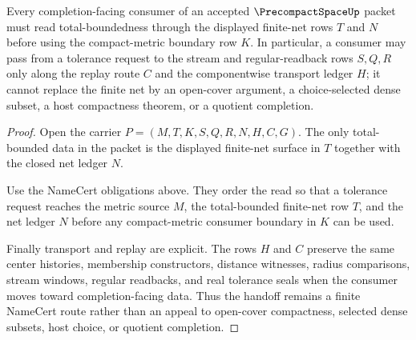 \begin{theorem}
\label{thm:precompact-space-total-bounded-handoff}
Every completion-facing consumer of an accepted $\PrecompactSpaceUp$ packet must read total-boundedness through the displayed finite-net rows $T$ and $N$ before using the compact-metric boundary row $K$. In particular, a consumer may pass from a tolerance request to the stream and regular-readback rows $S,Q,R$ only along the replay route $C$ and the componentwise transport ledger $H$; it cannot replace the finite net by an open-cover argument, a choice-selected dense subset, a host compactness theorem, or a quotient completion.
\end{theorem}
\begin{proof}
Open the carrier $P=(M,T,K,S,Q,R,N,H,C,G)$. The only total-bounded data in the packet is the displayed finite-net surface in $T$ together with the closed net ledger $N$.

Use the NameCert obligations above. They order the read so that a tolerance request reaches the metric source $M$, the total-bounded finite-net row $T$, and the net ledger $N$ before any compact-metric consumer boundary in $K$ can be used.

Finally transport and replay are explicit. The rows $H$ and $C$ preserve the same center histories, membership constructors, distance witnesses, radius comparisons, stream windows, regular readbacks, and real tolerance seals when the consumer moves toward completion-facing data. Thus the handoff remains a finite NameCert route rather than an appeal to open-cover compactness, selected dense subsets, host choice, or quotient completion.
\end{proof}


\begin{closurestatus}{\PrecompactSpaceUp}
  \theoryclosure{\seedClosure}
  \formalstatus{\formalTargetV}
\end{closurestatus}
